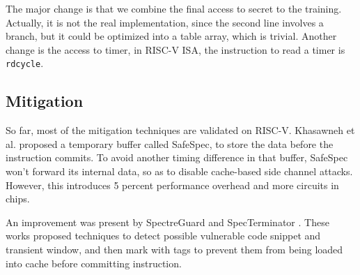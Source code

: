 The major change is that we combine the final access to secret to the training.
Actually, it is not the real implementation, since the second line involves a branch, but it could be optimized into a table array, which is trivial.
Another change is the access to timer, in RISC-V ISA, the instruction to read a timer is \verb|rdcycle|.

\subsection{Mitigation}

So far, most of the mitigation techniques are validated on RISC-V. Khasawneh et al.\cite{safespec} proposed a temporary buffer called SafeSpec, to store
the data before the instruction commits. To avoid another timing difference in that buffer, 
SafeSpec won't forward its internal data, so as to disable cache-based side channel attacks. However, this introduces 5 percent performance overhead and more circuits in chips.

An improvement was present by SpectreGuard \cite{spectreguard} and SpecTerminator \cite{specterminator}. These works proposed techniques to 
detect possible vulnerable code snippet and transient window, and then mark with tags to prevent them from being loaded into cache before committing instruction.